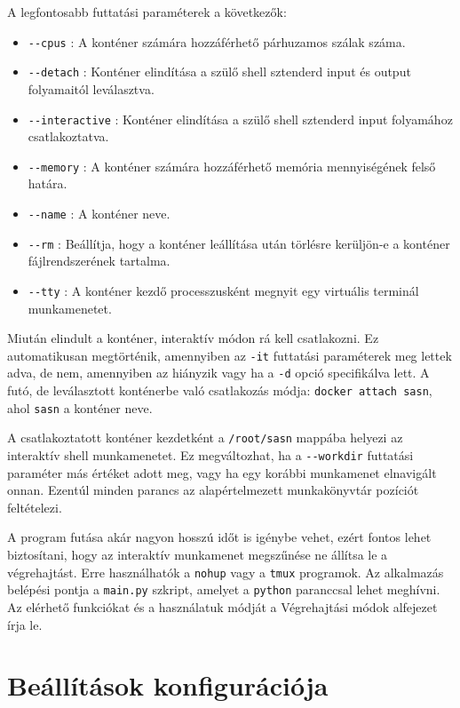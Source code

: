 \documentclass[twoside, 12pt]{report}
\begin{document}
\begin{samepage}
A legfontosabb futtatási paraméterek a következők:

\begin{itemize}[noitemsep]
  \item \verb|--cpus| : A konténer számára hozzáférhető párhuzamos szálak száma.
  \item \verb|--detach| : Konténer elindítása a szülő shell sztenderd input és output folyamaitól leválasztva.
  \item \verb|--interactive| : Konténer elindítása a szülő shell sztenderd input folyamához csatlakoztatva.
  \item \verb|--memory| : A konténer számára hozzáférhető memória mennyiségének felső határa.
  \item \verb|--name| : A konténer neve.
  \item \verb|--rm| : Beállítja, hogy a konténer leállítása után törlésre kerüljön-e a konténer fájlrendszerének tartalma.
  \item \verb|--tty| : A konténer kezdő processzusként megnyit egy virtuális terminál munkamenetet.
\end{itemize}
\end{samepage}

Miután elindult a konténer, interaktív módon rá kell csatlakozni. Ez automatikusan megtörténik, amennyiben az \verb|-it| futtatási paraméterek meg lettek adva, de nem, amennyiben az hiányzik vagy ha a \verb|-d| opció specifikálva lett. A futó, de leválasztott konténerbe való csatlakozás módja: \verb|docker attach sasn|, ahol \verb|sasn| a konténer neve.

A csatlakoztatott konténer kezdetként a \verb|/root/sasn| mappába helyezi az interaktív shell munkamenetet. Ez megváltozhat, ha a \verb|--workdir| futtatási paraméter más értéket adott meg, vagy ha egy korábbi munkamenet elnavigált onnan. Ezentúl minden parancs az alapértelmezett munkakönyvtár pozíciót feltételezi.

A program futása akár nagyon hosszú időt is igénybe vehet, ezért fontos lehet biztosítani, hogy az interaktív munkamenet megszűnése ne állítsa le a végrehajtást. Erre használhatók a \verb|nohup| vagy a \verb|tmux| programok. Az alkalmazás belépési pontja a \verb|main.py| szkript, amelyet a \verb|python| paranccsal lehet meghívni. Az elérhető funkciókat és a használatuk módját a Végrehajtási módok alfejezet írja le.

\section{Beállítások konfigurációja}
\end{document}
